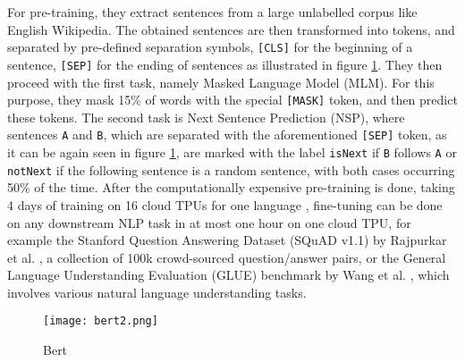 For pre-training, they extract sentences from a large unlabelled corpus like English Wikipedia. The obtained sentences are then transformed into tokens, and separated by pre-defined separation symbols, \verb![CLS]! for the beginning of a sentence, \verb![SEP]! for the ending of sentences as illustrated in figure \ref{fig:bert}. They then proceed with the first task, namely Masked Language Model (MLM). For this purpose, they mask 15\% of words with the special \verb![MASK]! token, and then predict these tokens. The second task is Next Sentence Prediction (NSP), where sentences \verb!A! and \verb!B!, which are separated with the aforementioned \verb![SEP]! token, as it can be again seen in figure \ref{fig:bert}, are marked with the label \verb!isNext! if \verb!B! follows \verb!A! or \verb!notNext! if the following sentence is a random sentence, with both cases occurring 50\% of the time. After the computationally expensive pre-training is done, taking 4 days of training on 16 cloud TPUs for one language \cite{googlebert}, fine-tuning can be done on any downstream NLP task in at most one hour on one cloud TPU, for example the Stanford Question Answering Dataset (SQuAD v1.1) by Rajpurkar et al. \cite{rajpurkar2016squad}, a collection of 100k crowd-sourced question/answer pairs, or the General Language Understanding Evaluation (GLUE) benchmark by Wang et al. \cite{wang2018glue}, which involves various natural language understanding tasks. 


\begin{figure}[h]
  \centering
  \texttt{[image: bert2.png]}\\
  \caption{Bert}
  \label{fig:bert}
\end{figure}


\begin{comment}
\begin{figure}[h]
  \centering
  \texttt{[image: bert.png]}\\
  \caption{Bert}
  \label{fig:bert}
\end{figure}
\end{comment}

